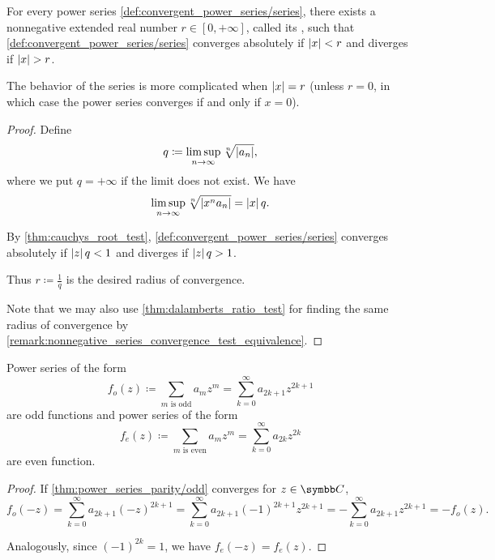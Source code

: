 \begin{theorem}\label{thm:power_series_radius_of_convergence}
  For every power series \cref{def:convergent_power_series/series}, there exists a nonnegative extended real number \( r \in [0, +\infty] \), called its , such that \cref{def:convergent_power_series/series} converges absolutely if \( \left\vert x \right\vert < r \) and diverges if \( \left\vert x \right\vert > r \).

  The behavior of the series is more complicated when \( \left\vert x \right\vert = r \) (unless \( r = 0 \), in which case the power series converges if and only if \( x = 0 \)).
\end{theorem}
\begin{proof}
  Define
  \begin{equation*}
    q \coloneqq \limsup_{n \to \infty} \sqrt[n]{\left\vert a_n \right\vert},
  \end{equation*}
  where we put \( q = +\infty \) if the limit does not exist. We have
  \begin{equation*}
    \limsup_{n \to \infty} \sqrt[n]{\left\vert x^n a_n \right\vert} = \left\vert x \right\vert q.
  \end{equation*}

  By \cref{thm:cauchys_root_test}, \cref{def:convergent_power_series/series} converges absolutely if \( \left\vert z \right\vert q < 1 \) and diverges if \( \left\vert z \right\vert q > 1 \).

  Thus \( r \coloneqq \tfrac 1 q \) is the desired radius of convergence.

  Note that we may also use \cref{thm:dalamberts_ratio_test} for finding the same radius of convergence by \cref{remark:nonnegative_series_convergence_test_equivalence}.
\end{proof}

\begin{proposition}\label{thm:power_series_parity}
  Power series of the form
  \begin{equation}\label{thm:power_series_parity/odd}
    f_o(z) \coloneqq \sum_{m \text{ is odd}} a_m z^m = \sum_{k=0}^\infty a_{2k+1} z^{2k+1}
  \end{equation}
  are odd functions and power series of the form
  \begin{equation}\label{thm:power_series_parity/even}
    f_e(z) \coloneqq \sum_{m \text{ is even}} a_m z^m = \sum_{k=0}^\infty a_{2k} z^{2k}
  \end{equation}
  are even function.
\end{proposition}
\begin{proof}
  If \cref{thm:power_series_parity/odd} converges for \( z \in \C \),
  \begin{equation*}
    f_o(-z)
    =
    \sum_{k=0}^\infty a_{2k+1} (-z)^{2k+1}
    =
    \sum_{k=0}^\infty a_{2k+1} (-1)^{2k+1} z^{2k+1}
    =
    - \sum_{k=0}^\infty a_{2k+1} z^{2k+1}
    =
    - f_o(z).
  \end{equation*}

  Analogously, since \( (-1)^{2k} = 1 \), we have \( f_e(-z) = f_e(z) \).
\end{proof}
